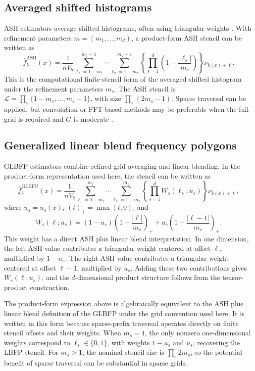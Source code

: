 \documentclass[pdflatex,sn-mathphys-ay]{sn-jnl}
\theoremstyle{thmstyleone}
\newcommand{\fhatb}{\widehat{f}_b}
\newcommand{\stencil}{\mathcal{L}}
\begin{document}
\subsection{Averaged shifted histograms}

ASH estimators average shifted histograms, often using triangular weights \citep{Scott1985ASH}. With refinement parameters \(m=(m_1,\ldots,m_d)\), a product-form ASH stencil can be written as
\[
\fhatb^{\mathrm{ASH}}(x)
=
\frac{1}{nV_b}
\sum_{\ell_1=1-m_1}^{m_1-1}
\cdots
\sum_{\ell_d=1-m_d}^{m_d-1}
\left\{
\prod_{s=1}^d
\left(1-\frac{|\ell_s|}{m_s}\right)
\right\}
\nu_{k(x)+\ell}.
\]
This is the computational finite-stencil form of the averaged shifted histogram under the refinement parameters \(m_s\). The ASH stencil is
\(\stencil=\prod_s\{1-m_s,\ldots,m_s-1\}\), with size \(\prod_s(2m_s-1)\). Sparse traversal can be applied, but convolution or FFT-based methods may be preferable when the full grid is required and \(G\) is moderate \citep{Silverman1982FFT,GramackiGramacki2017}.

\subsection{Generalized linear blend frequency polygons}

GLBFP estimators combine refined-grid averaging and linear blending. In the product-form representation used here, the stencil can be written as
\[
\fhatb^{\mathrm{GLBFP}}(x)
=
\frac{1}{nV_b}
\sum_{\ell_1=1-m_1}^{m_1}
\cdots
\sum_{\ell_d=1-m_d}^{m_d}
\left\{\prod_{s=1}^d W_s(\ell_s;u_s)\right\}
\nu_{k(x)+\ell},
\]
where \(u_s=u_s(x)\), \((t)_+=\max(t,0)\), and
\[
W_s(\ell;u_s)
=
(1-u_s)\left(1-\frac{|\ell|}{m_s}\right)_+
+
u_s\left(1-\frac{|\ell-1|}{m_s}\right)_+.
\]
This weight has a direct ASH plus linear blend interpretation. In one dimension, the left ASH value contributes a triangular weight centered at offset \(\ell\), multiplied by \(1-u_s\). The right ASH value contributes a triangular weight centered at offset \(\ell-1\), multiplied by \(u_s\). Adding these two contributions gives \(W_s(\ell;u_s)\), and the \(d\)-dimensional product structure follows from the tensor-product construction.

The product-form expression above is algebraically equivalent to the ASH plus linear blend definition of the GLBFP under the grid convention used here. It is written in this form because sparse-prefix traversal operates directly on finite stencil offsets and their weights. When \(m_s=1\), the only nonzero one-dimensional weights correspond to \(\ell_s\in\{0,1\}\), with weights \(1-u_s\) and \(u_s\), recovering the LBFP stencil. For \(m_s>1\), the nominal stencil size is \(\prod_s 2m_s\), so the potential benefit of sparse traversal can be substantial in sparse grids.
\end{document}
